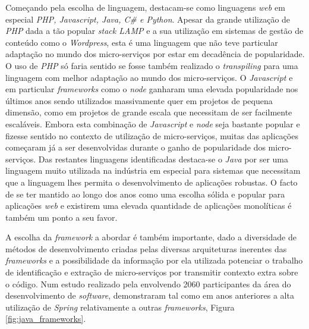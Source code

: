     Começando pela escolha de linguagem, destacam-se como linguagens \textit{web} em especial \textit{PHP, Javascript, Java, C\# e Python}. Apesar da grande utilização de \textit{PHP} dada a tão popular \textit{stack LAMP} e a sua utilização em sistemas de gestão de conteúdo como o \textit{Wordpress}, esta é uma linguagem que não teve particular adaptação no mundo dos micro-serviços por estar em decadência de popularidade. O uso de \textit{PHP} só faria sentido se fosse também realizado o \textit{transpiling} para uma linguagem com melhor adaptação ao mundo dos micro-serviços. O \textit{Javascript} e em particular \textit{frameworks} como o \textit{node} ganharam uma elevada popularidade nos últimos anos sendo utilizados massivamente quer em projetos de pequena dimensão, como em projetos de grande escala que necessitam de ser facilmente escaláveis. Embora esta combinação de \textit{Javascript} e \textit{node} seja bastante popular e fizesse sentido no contexto de utilização de micro-serviços, muitas das aplicações começaram já a ser desenvolvidas durante o ganho de popularidade dos micro-serviços. Das restantes linguagens identificadas destaca-se o \textit{Java} por ser uma linguagem muito utilizada na indústria em especial para sistemas que necessitam que a linguagem lhes permita o desenvolvimento de aplicações robustas. O facto de se ter mantido ao longo dos anos como uma escolha sólida e popular para aplicações \textit{web} e existirem uma elevada quantidade de aplicações monolíticas é também um ponto a seu favor.
    
    A escolha da \textit{framework} a abordar é também importante, dado a diversidade de métodos de desenvolvimento criadas pelas diversas arquiteturas inerentes das \textit{frameworks} e a possibilidade da informação por ela utilizada potenciar o trabalho de identificação e extração de micro-serviços por transmitir contexto extra sobre o código. Num estudo realizado pela \cite{java_frameworks} envolvendo 2060 participantes da área do desenvolvimento de \textit{software}, demonstraram tal como em anos anteriores a alta utilização de \textit{Spring} relativamente a outras \textit{frameworks}, Figura \ref{fig:java_frameworks}. 
    
